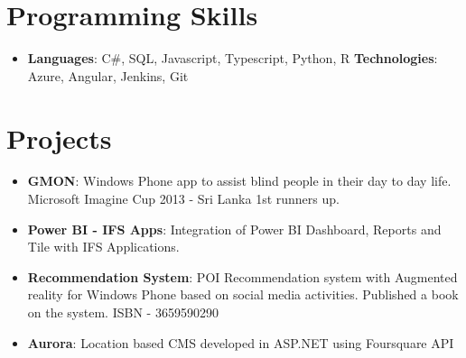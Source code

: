 \documentclass[letterpaper,11pt]{article}
\newcommand{\resumeItem}[2]{
  \item\small{
    \textbf{#1}{: #2 \vspace{-2pt}}
  }
}
\newcommand{\resumeSubItem}[2]{\resumeItem{#1}{#2}\vspace{-4pt}}
\newcommand{\resumeSubHeadingListStart}{\begin{itemize}[leftmargin=*]}
\newcommand{\resumeSubHeadingListEnd}{\end{itemize}}
\begin{document}
\section{Programming Skills}
  \resumeSubHeadingListStart
    \item{
      \textbf{Languages}{: C\#, SQL, Javascript, Typescript, Python, R}
      \hfill
      \textbf{Technologies}{: Azure, Angular, Jenkins, Git}
    }
  \resumeSubHeadingListEnd



\section{Projects}
  \resumeSubHeadingListStart
    \resumeSubItem{GMON}
      {Windows Phone app to assist blind people in their day to day life. Microsoft Imagine Cup 2013 - Sri Lanka 1st runners up.}
    \resumeSubItem{Power BI - IFS Apps}
      {Integration of Power BI Dashboard, Reports and Tile with IFS Applications.}
    \resumeSubItem{Recommendation System}
      {POI Recommendation system with Augmented reality for Windows Phone based on social media activities. Published a book on the system. ISBN - 3659590290}
    \resumeSubItem{Aurora}
      {Location based CMS developed in ASP.NET using Foursquare API}
  \resumeSubHeadingListEnd


\end{document}
